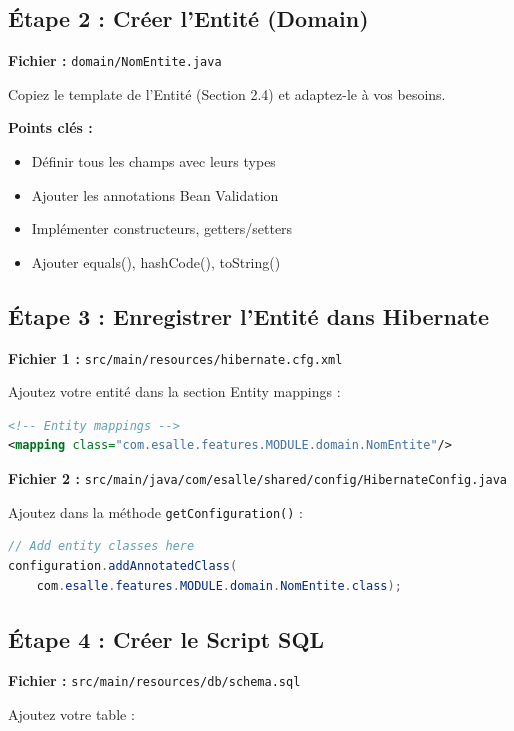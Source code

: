 \documentclass[12pt,a4paper]{article}
\begin{document}
\subsection{Étape 2 : Créer l'Entité (Domain)}

\textbf{Fichier :} \texttt{domain/NomEntite.java}

Copiez le template de l'Entité (Section 2.4) et adaptez-le à vos besoins.

\textbf{Points clés :}
\begin{itemize}
    \item Définir tous les champs avec leurs types
    \item Ajouter les annotations Bean Validation
    \item Implémenter constructeurs, getters/setters
    \item Ajouter equals(), hashCode(), toString()
\end{itemize}

\subsection{Étape 3 : Enregistrer l'Entité dans Hibernate}

\textbf{Fichier 1 :} \texttt{src/main/resources/hibernate.cfg.xml}

Ajoutez votre entité dans la section Entity mappings :

\begin{lstlisting}[language=XML]
<!-- Entity mappings -->
<mapping class="com.esalle.features.MODULE.domain.NomEntite"/>
\end{lstlisting}

\textbf{Fichier 2 :} \texttt{src/main/java/com/esalle/shared/config/HibernateConfig.java}

Ajoutez dans la méthode \texttt{getConfiguration()} :

\begin{lstlisting}[language=Java]
// Add entity classes here
configuration.addAnnotatedClass(
    com.esalle.features.MODULE.domain.NomEntite.class);
\end{lstlisting}

\subsection{Étape 4 : Créer le Script SQL}

\textbf{Fichier :} \texttt{src/main/resources/db/schema.sql}

Ajoutez votre table :
\end{document}
